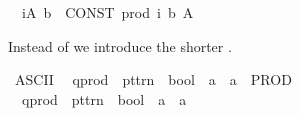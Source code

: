 \begin{isabellebody}
{}\isanewline
\ \ {\isachardoublequoteopen}{\isasymProd}i{\isasymin}A{\isachardot}{\kern0pt}\ b{\isachardoublequoteclose}\ {\isacharequal}{\kern0pt}{\isacharequal}{\kern0pt}\ {\isachardoublequoteopen}CONST\ prod\ {\isacharparenleft}{\kern0pt}{\isasymlambda}i{\isachardot}{\kern0pt}\ b{\isacharparenright}{\kern0pt}\ A{\isachardoublequoteclose}%
\begin{isamarkuptext}%
Instead of  we introduce the shorter .%
\end{isamarkuptext}\isamarkuptrue%
\isamarkupfalse%
\ {\isacharparenleft}{\kern0pt}ASCII{\isacharparenright}{\kern0pt}\isanewline
\ \ {\isachardoublequoteopen}{\isacharunderscore}{\kern0pt}qprod{\isachardoublequoteclose}\ {\isacharcolon}{\kern0pt}{\isacharcolon}{\kern0pt}\ {\isachardoublequoteopen}pttrn\ {\isasymRightarrow}\ bool\ {\isasymRightarrow}\ {\isacharprime}{\kern0pt}a\ {\isasymRightarrow}\ {\isacharprime}{\kern0pt}a{\isachardoublequoteclose}\ \ {\isacharparenleft}{\kern0pt}{\isachardoublequoteopen}{\isacharparenleft}{\kern0pt}{}PROD\ {\isacharunderscore}{\kern0pt}\ {\isacharbar}{\kern0pt}{\isacharslash}{\kern0pt}\ {\isacharunderscore}{\kern0pt}{\isachardot}{\kern0pt}{\isacharslash}{\kern0pt}\ {\isacharunderscore}{\kern0pt}{\isacharparenright}{\kern0pt}{\isachardoublequoteclose}\ {\isacharbrackleft}{\kern0pt}{}{\isacharcomma}{\kern0pt}\ {}{\isacharcomma}{\kern0pt}\ {}{}{\isacharbrackright}{\kern0pt}\ {}{}{\isacharparenright}{\kern0pt}\isanewline
{}\isamarkupfalse%
\isanewline
\ \ {\isachardoublequoteopen}{\isacharunderscore}{\kern0pt}qprod{\isachardoublequoteclose}\ {\isacharcolon}{\kern0pt}{\isacharcolon}{\kern0pt}\ {\isachardoublequoteopen}pttrn\ {\isasymRightarrow}\ bool\ {\isasymRightarrow}\ {\isacharprime}{\kern0pt}a\ {\isasymRightarrow}\ {\isacharprime}{\kern0pt}a{\isachardoublequoteclose}\ \ {\isacharparenleft}{\kern0pt}{\isachardoublequoteopen}{\isacharparenleft}{\kern0pt}{}{\isasymProd}{\isacharunderscore}{\kern0pt}\ {\isacharbar}{\kern0pt}\ {\isacharparenleft}{\kern0pt}{\isacharunderscore}{\kern0pt}{\isacharparenright}{\kern0pt}{\isachardot}{\kern0pt}{\isacharslash}{\kern0pt}\ {\isacharunderscore}{\kern0pt}{\isacharparenright}{\kern0pt}{\isachardoublequoteclose}\ {\isacharbrackleft}{\kern0pt}{}{\isacharcomma}{\kern0pt}\ {}{\isacharcomma}{\kern0pt}\ {}{}{\isacharbrackright}{\kern0pt}\ {}{}{\isacharparenright}{\kern0pt}\isanewline

\end{isabellebody}

